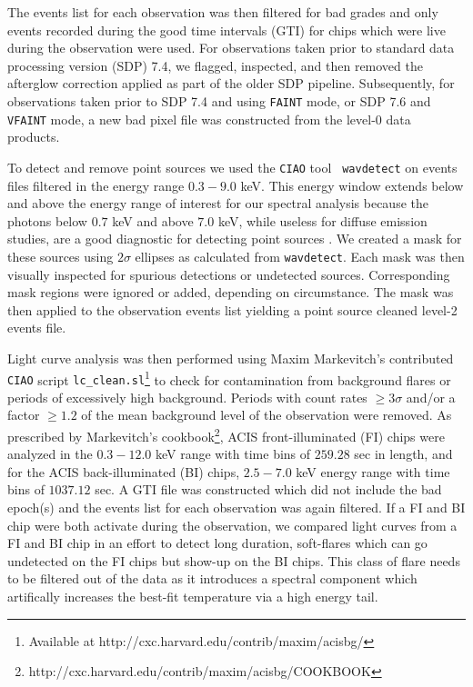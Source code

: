 \documentclass{emulateapj}
\begin{document}
The events list for each observation was then filtered for bad
grades and only events recorded during the good time intervals (GTI)
for chips which were live during the observation were used. For
observations taken prior to standard data processing version (SDP)
7.4, we flagged, inspected, and then removed the afterglow correction
applied as part of the older SDP pipeline. Subsequently, for observations taken
prior to SDP 7.4 and using {\tt FAINT} mode, or SDP 7.6 and {\tt VFAINT} mode, a new
bad pixel file was constructed from the level-0 data products.

To detect and remove point sources we used the {\tt CIAO} tool {\tt
wavdetect} \citep{2002ApJS..138..185F} on events files filtered in
the energy range $0.3-9.0$ keV. This energy
window extends below and above the energy range of
interest for our spectral analysis because the photons below $0.7$ keV
and above $7.0$ keV, while useless for diffuse emission studies, are a
good diagnostic for detecting point sources
\citep{2000SPIE.4012...17J}. We created a mask for these
sources using $2\sigma$ ellipses as calculated from
{\tt wavdetect}. Each mask was then visually inspected for spurious
detections or undetected sources. Corresponding mask regions were
ignored or added, depending on circumstance. The
mask was then applied to the observation events list yielding a point
source cleaned level-2 events file.

Light curve analysis was then performed using Maxim Markevitch's
contributed {\tt CIAO} script {\tt lc\_clean.sl}\footnote{Available at
http://cxc.harvard.edu/contrib/maxim/acisbg/} to check for
contamination from background flares or periods of excessively high
background. Periods with count rates $\geq 3\sigma$
and/or a factor $\geq 1.2$ of the mean background level of the
observation were removed. As prescribed by Markevitch's
cookbook\footnote{http://cxc.harvard.edu/contrib/maxim/acisbg/COOKBOOK},
ACIS front-illuminated (FI) chips were analyzed in the $0.3-12.0$ keV range
with time bins of $259.28$ sec in length, and for the ACIS
back-illuminated (BI)
chips, $2.5-7.0$ keV energy range with time bins of $1037.12$ sec. A
GTI file was constructed which did not include the bad epoch(s) and the
events list for each observation was again filtered. If a
FI and BI chip were both activate during the observation,
we compared light curves from a FI and BI chip in an effort to
detect long duration, soft-flares which can go undetected on the FI
chips but show-up on the BI chips. This class of flare needs to be
filtered out of the data as it introduces a spectral component which
artifically increases the best-fit temperature via a high energy tail.
\end{document}
